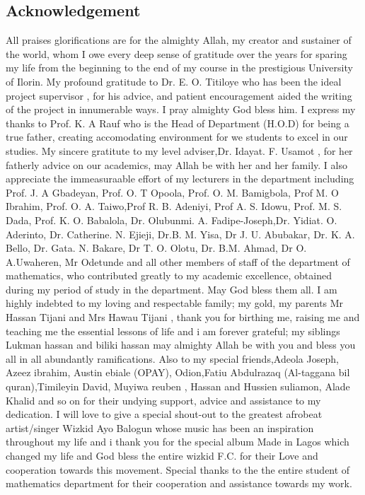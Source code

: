 \documentclass[a4paper, 12pt]{report}
\begin{document}
\newpage
\begin{center}
\section*{Acknowledgement}
\end{center}
All praises glorifications are for the almighty Allah, my creator and sustainer
of the world, whom I owe every deep sense of gratitude over the
years for sparing my life from the beginning to the end of my course in
the prestigious University of Ilorin.
My profound gratitude to Dr. E. O. Titiloye who has been the ideal project supervisor , for his advice, and patient encouragement
aided the writing of the project in innumerable ways. I pray
almighty God bless him.
I express my thanks to  Prof. K. A Rauf who is the Head of Department
(H.O.D) for being a true father, creating accomodating environment for we students to excel in our studies. My sincere gratitute to my level adviser,Dr. Idayat. F. Usamot , for her fatherly advice on our academics, may Allah be with her and her family.
I also appreciate the immeasuraable effort of my lecturers in the department including Prof. J. A Gbadeyan, Prof. O. T Opoola, Prof. O. M.
Bamigbola, Prof M. O Ibrahim, Prof. O. A. Taiwo,Prof R. B. Adeniyi, Prof A. S. Idowu, Prof. M. S. Dada, Prof. K. O. Babalola, Dr. Olubunmi. A. Fadipe-Joseph,Dr. Yidiat. O. Aderinto, Dr. Catherine. N. Ejieji, Dr.B. M. Yisa, Dr J. U. Abubakar, Dr. K. A. Bello, Dr. Gata. N. Bakare, Dr T. O. Olotu, Dr. B.M. Ahmad, Dr O. A.Uwaheren, Mr Odetunde and all other members of staff of the department of mathematics, who contributed greatly to my academic excellence, obtained during my period of study in the department. May God bless them all.\newline
I am highly indebted to my loving and respectable family; my gold, my
parents Mr Hassan Tijani and Mrs Hawau Tijani , thank you for birthing me, raising me and teaching me the essential lessons of life and i am forever grateful; my siblings Lukman hassan and biliki hassan may almighty Allah be with you and bless you all in all abundantly ramifications.\newline
Also to my special friends,Adeola Joseph, Azeez ibrahim, Austin ebiale (OPAY), Odion,Fatiu Abdulrazaq (Al-taggana bil quran),Timileyin David, Muyiwa reuben , Hassan and Hussien suliamon, Alade Khalid and so on  for their undying support, advice and assistance to my dedication.\newline
I will love to give a special shout-out to the greatest afrobeat artist/singer Wizkid Ayo Balogun whose music has been an inspiration throughout my life and i thank you for the special album Made in Lagos which changed my life and God bless the entire wizkid F.C. for their Love and cooperation towards this movement.\newline
Special thanks to the the entire student of mathematics department for their cooperation and assistance towards my work.
\end{document}
